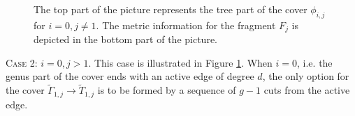 \documentclass[11pt,reqno]{amsart}
\newcommand{\inputTikZ}[2]{%
     \resizebox{#1}{!}{}}
\theoremstyle{definition}
\begin{document}

\begin{figure}[tb]
    \centering
    \inputTikZ{1\textwidth}{Figures/i0sol}
    \caption{The top part of the picture represents the tree part of the cover $\phi_{i,j}$ for $i=0, j\not=1$. The metric information for the fragment $F_j$ is depicted in the bottom part of the picture.}
    \label{fig:gensoli0}
\end{figure}



\vspace{0.2cm}

\textsc{Case 2: $i=0, j>1$.}
This case is illustrated in Figure \ref{fig:gensoli0}. When $i=0$, i.e. the genus part of the cover ends with an active edge of degree $d$, the only option for the cover $\tilde{\Gamma}_{1,j}\to \tilde{T}_{1,j}$ is to be formed by a sequence of $g-1$ cuts from the active edge.
\end{document}
